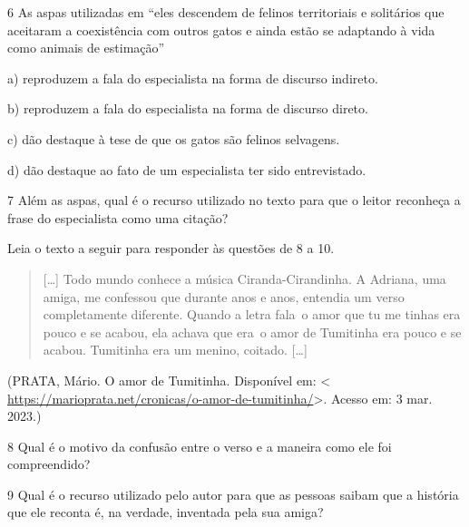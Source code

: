 {\num{6} As aspas utilizadas em ``eles descendem de felinos territoriais
e solitários que aceitaram a coexistência com outros gatos e ainda estão
se adaptando à vida como animais de estimação''

a) reproduzem a fala do especialista na forma de discurso indireto.

b) reproduzem a fala do especialista na forma de discurso direto.

c) dão destaque à tese de que os gatos são felinos selvagens.

d) dão destaque ao fato de um especialista ter sido entrevistado.


\num{7} Além as aspas, qual é o recurso utilizado no texto para que o
leitor reconheça a frase do especialista como uma citação?



Leia o texto a seguir para responder às questões de 8 a 10.

\begin{quote}
{[}\ldots{]} Todo mundo conhece a música Ciranda-Cirandinha. A Adriana,
uma amiga, me confessou que durante anos e anos, entendia um verso
completamente diferente. Quando a letra fala~o amor que tu me tinhas era
pouco e se acabou, ela achava que era~o amor de Tumitinha era pouco e se
acabou. Tumitinha era um menino, coitado. {[}\ldots{]}
\end{quote}

(PRATA, Mário. O amor de Tumitinha. Disponível em: \textless{}
\url{https://marioprata.net/cronicas/o-amor-de-tumitinha/}\textgreater.
Acesso em: 3 mar. 2023.)

\num{8} Qual é o motivo da confusão entre o verso e a maneira como ele
foi compreendido?



\num{9} Qual é o recurso utilizado pelo autor para que as pessoas saibam
que a história que ele reconta é, na verdade, inventada pela sua amiga?

}

